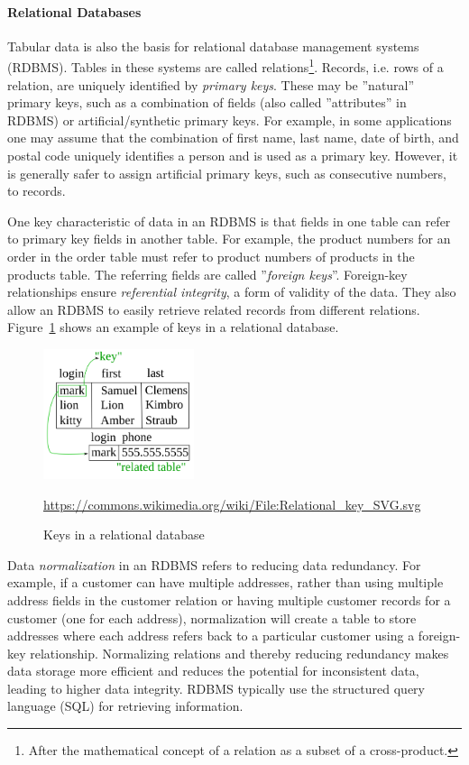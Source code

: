 \paragraph*{Relational Databases}

Tabular data is also the basis for relational database management systems (RDBMS). Tables in these systems are called relations\footnote{After the mathematical concept of a relation as a subset of a cross-product.}. Records, i.e. rows of a relation, are uniquely identified by \emph{primary keys}. These may be ''natural'' primary keys, such as a combination of fields (also called ''attributes'' in RDBMS) or artificial/synthetic primary keys. For example, in some applications one may assume that the combination of first name, last name, date of birth, and postal code uniquely identifies a person and is used as a primary key. However, it is generally safer to assign artificial primary keys, such as consecutive numbers, to records. 

One key characteristic of data in an RDBMS is that fields in one table can refer to primary key fields in another table. For example, the product numbers for an order in the order table must refer to product numbers of products in the products table. The referring fields are called ''\emph{foreign keys}''. Foreign-key relationships ensure \emph{referential integrity}, a form of validity of the data. They also allow an RDBMS to easily retrieve related records from different relations. Figure~\ref{fig:relationkeys} shows an example of keys in a relational database.

\begin{figure}
\centering
\includegraphics[height=1.5in]{Relational_key.png}

\scriptsize{\url{https://commons.wikimedia.org/wiki/File:Relational_key_SVG.svg}}
\caption{Keys in a relational database}
\label{fig:relationkeys}
\end{figure}

Data \emph{normalization} in an RDBMS refers to reducing data redundancy. For example, if a customer can have multiple addresses, rather than using multiple address fields in the customer relation or having multiple customer records for a customer (one for each address), normalization will create a table to store addresses where each address refers back to a particular customer using a foreign-key relationship. Normalizing relations and thereby reducing redundancy makes data storage more efficient and reduces the potential for inconsistent data, leading to higher data integrity. RDBMS typically use the structured query language (SQL) for retrieving information. 

